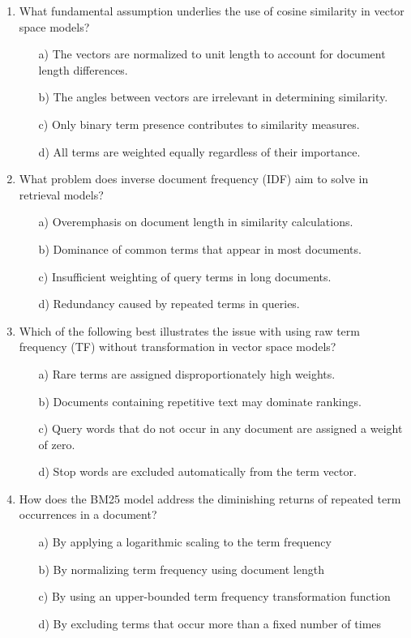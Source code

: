 \documentclass[8pt]{extarticle}
\begin{document}
\begin{multicols}{2}
\begin{enumerate}
\item What fundamental assumption underlies the use of cosine similarity in vector space models?
\begin{itemize}
    \item[a)] The vectors are normalized to unit length to account for document length differences.
    \item[b)] The angles between vectors are irrelevant in determining similarity.
    \item[c)] Only binary term presence contributes to similarity measures.
    \item[d)] All terms are weighted equally regardless of their importance.
\end{itemize}


\item What problem does inverse document frequency (IDF) aim to solve in retrieval models? 
\begin{itemize}
    \item[a)] Overemphasis on document length in similarity calculations. 
    \item[b)] Dominance of common terms that appear in most documents. 
    \item [c)] Insufficient weighting of query terms in long documents. 
    \item[d)] Redundancy caused by repeated terms in queries. 
\end{itemize} 
     

\item Which of the following best illustrates the issue with using raw term frequency (TF) without transformation in vector space models? 
\begin{itemize}
    \item[a)] Rare terms are assigned disproportionately high weights. \item[b)] Documents containing repetitive text may dominate rankings. 
    \item[c)] Query words that do not occur in any document are assigned a weight of zero. 
    \item[d)] Stop words are excluded automatically from the term vector. 
\end{itemize}  

\item How does the BM25 model address the diminishing returns of repeated term occurrences in a document?
\begin{itemize}
    \item[a)] By applying a logarithmic scaling to the term frequency
    \item[b)] By normalizing term frequency using document length
    \item[c)] By using an upper-bounded term frequency transformation function
    \item[d)] By excluding terms that occur more than a fixed number of times
\end{itemize}
 


\end{enumerate}
\end{multicols}
\end{document}
